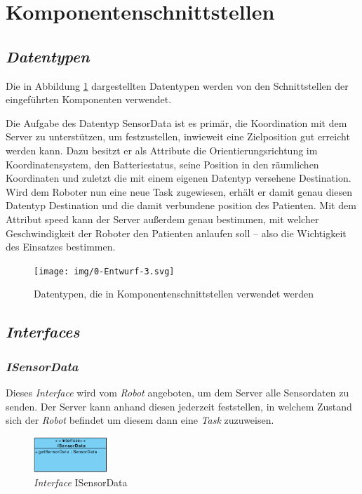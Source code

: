 \section{Komponentenschnittstellen}

\subsection{\textit{Datentypen}}
Die in Abbildung \ref{KomponentenschnittstellenDiagramm} dargestellten Datentypen werden von den Schnittstellen der eingeführten Komponenten verwendet. 

Die Aufgabe des Datentyp SensorData ist es primär, die Koordination mit dem Server zu unterstützen, um festzustellen, inwieweit eine Zielposition gut erreicht werden kann. Dazu besitzt er als Attribute die Orientierungsrichtung im Koordinatensystem, den Batteriestatus, seine Position in den räumlichen Koordinaten und zuletzt die mit einem eigenen Datentyp versehene Destination. Wird dem Roboter nun eine neue Task zugewiesen, erhält er damit genau diesen Datentyp Destination und die damit verbundene position des Patienten. Mit dem Attribut speed kann der Server außerdem genau bestimmen, mit welcher Geschwindigkeit der Roboter den Patienten anlaufen soll – also die Wichtigkeit des Einsatzes bestimmen.

	
	\begin{figure}[H]
		\centering
		\texttt{[image: img/0-Entwurf-3.svg]}
		\caption{Datentypen, die in Komponentenschnittstellen verwendet werden}
		\label{KomponentenschnittstellenDiagramm}
	\end{figure}
	\pagebreak

\subsection{\textit{Interfaces}}
	\subsubsection{\textit{ISensorData}}
	Dieses \textit{Interface} wird vom \textit{Robot} angeboten, um dem Server alle Sensordaten zu senden. Der Server kann anhand diesen jederzeit feststellen, in welchem Zustand sich der \textit{Robot} befindet um diesem dann eine \textit{Task} zuzuweisen.
	\begin{figure}[H]
	\centering
	\includegraphics[width=0.25\textwidth]{img/1-Entwurf-3-1_ISensorData}
	\caption{\textit{Interface} ISensorData}
	\label{ISensorData}
	\end{figure}
	

